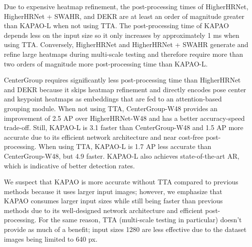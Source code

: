 \documentclass[runningheads]{llncs}
\newcommand\hlll[1]{\bgroup
  \hskip0pt\color{black}#1\egroup
}
\begin{document}
Due to expensive heatmap refinement, the post-processing times of HigherHRNet, HigherHRNet + SWAHR, and DEKR are at least an order of magnitude greater than KAPAO-L when not using TTA. The post-processing time of KAPAO depends less on the input size so it only increases by approximately 1 ms when using TTA. Conversely, HigherHRNet and HigherHRNet + SWAHR generate and refine large heatmaps during multi-scale testing and therefore require more than two orders of magnitude more post-processing time than KAPAO-L.

CenterGroup requires significantly less post-processing time than HigherHRNet and DEKR because it skips heatmap refinement and directly encodes pose center and keypoint heatmaps as embeddings that are fed to an attention-based grouping module. When not using TTA, CenterGroup-W48 provides an improvement of 2.5 AP over HigherHRNet-W48 and has a better accuracy-speed trade-off. \hlll{Still,} KAPAO-L is 3.1 faster than CenterGroup-W48 and 1.5 AP more accurate due to its efficient network architecture and near cost-free post-processing. When using TTA, KAPAO-L is \hlll{1.7 AP less accurate} than CenterGroup-W48, but 4.9 faster. KAPAO-L also achieves state-of-the-art AR, which is indicative of better detection rates. 

\hlll{We suspect that KAPAO is more accurate without TTA compared to previous methods because it uses larger input images; however, we emphasize that KAPAO consumes larger input sizes while still being faster than previous methods due to its well-designed network architecture and efficient post-processing. For the same reason, TTA (multi-scale testing in particular) doesn't provide as much of a benefit; input sizes 1280 are less effective due to the dataset images being limited to 640 px.} 
\end{document}

